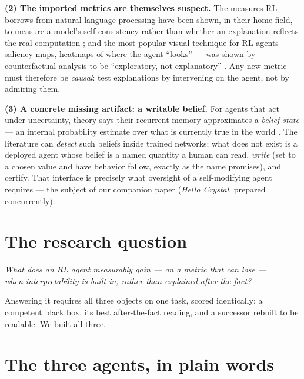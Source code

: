 \documentclass[11pt]{article}
\begin{document}
\textbf{(2) The imported metrics are themselves suspect.} The measures RL borrows from natural
language processing have been shown, in their home field, to measure a model's
self-consistency rather than whether an explanation reflects the real computation
\citep{parcalabescu2024}; and the most popular visual technique for RL agents --- saliency
maps, heatmaps of where the agent ``looks'' --- was shown by counterfactual analysis to be
``exploratory, not explanatory'' \citep{atrey2020}. Any new metric must therefore be
\emph{causal}: test explanations by intervening on the agent, not by admiring them.

\textbf{(3) A concrete missing artifact: a writable belief.} For agents that act under
uncertainty, theory says their recurrent memory approximates a \emph{belief state} --- an
internal probability estimate over what is currently true in the world
\citep{lambrechts2022,kaelbling1998}. The literature can \emph{detect} such beliefs inside
trained networks; what does not exist is a deployed agent whose belief is a named quantity a
human can read, \emph{write} (set to a chosen value and have behavior follow, exactly as the
name promises), and certify. That interface is precisely what oversight of a self-modifying
agent requires --- the subject of our companion paper (\emph{Hello Crystal}, prepared
concurrently).

\section{The research question}
\label{sec:rq}

\begin{center}
\begin{minipage}{.92\linewidth}
\centering
\emph{What does an RL agent measurably gain --- on a metric that can lose ---\\
when interpretability is built in, rather than explained after the fact?}
\end{minipage}
\end{center}

\noindent Answering it requires all three objects on one task, scored identically: a
competent black box, its best after-the-fact reading, and a successor rebuilt to be readable.
We built all three.

\section{The three agents, in plain words}
\label{sec:agents}
\end{document}
